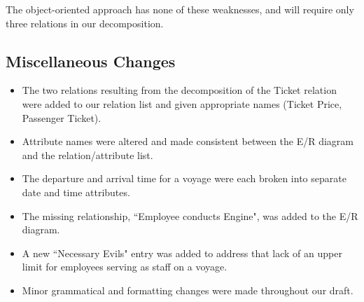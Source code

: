 \documentclass[a4paper]{article}
\begin{document}
The object-oriented approach has none of these weaknesses, and will require only three relations in our decomposition.\\
	
\subsection*{Miscellaneous Changes}
\begin{itemize}
\item The two relations resulting from the decomposition of the Ticket relation were added to our relation list and given appropriate names (Ticket Price, Passenger Ticket).
    
\item Attribute names were altered and made consistent between the E/R diagram and the relation/attribute list.

\item The departure and arrival time for a voyage were each broken into separate date and time attributes.

\item The missing relationship, ``Employee conducts Engine", was added to the E/R diagram.

\item A new ``Necessary Evils" entry was added to address that lack of an upper limit for employees serving as staff on a voyage.

\item Minor grammatical and formatting changes were made throughout our draft.
\end{itemize}
\end{document}
